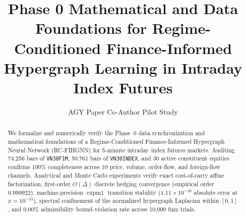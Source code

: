 \documentclass[11pt,a4paper]{article}
\title{Phase 0 Mathematical and Data Foundations for Regime-Conditioned Finance-Informed Hypergraph Learning in Intraday Index Futures}
\author{AGY Paper Co-Author Pilot Study}
\date{}
\begin{document}
\maketitle

\begin{abstract}
We formalize and numerically verify the Phase~0 data synchronization and mathematical foundations of a Regime-Conditioned Finance-Informed Hypergraph Neural Network (RC-FIHGNN) for 5-minute intraday index futures markets. Auditing 74,256 bars of \texttt{VN30F1M}, 50,761 bars of \texttt{VN30INDEX}, and 30 active constituent equities confirms $100\%$ completeness across 10 price, volume, order-flow, and foreign-flow channels. Analytical and Monte Carlo experiments verify exact cost-of-carry affine factorization, first-order $O(\Delta)$ discrete hedging convergence (empirical order $0.999922$), machine-precision $\operatorname{expm1}$ transition stability ($1.11 \times 10^{-16}$ absolute error at $x = 10^{-13}$), spectral confinement of the normalized hypergraph Laplacian within $[0, 1]$, and $0.00\%$ admissibility bound-violation rate across 10,000 fuzz trials.
\end{abstract}









\end{document}
